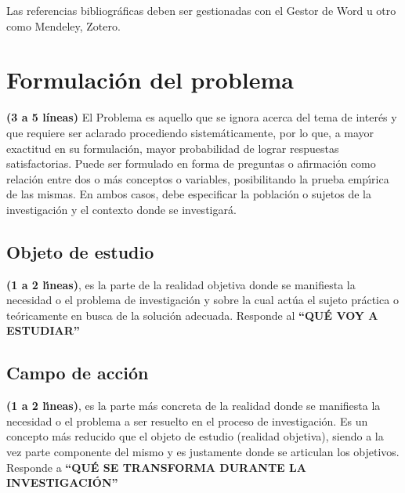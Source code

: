 Las referencias bibliogr\'{a}ficas deben ser gestionadas con el Gestor de Word u otro como Mendeley, 
Zotero. 



\section{Formulaci\'on del problema}
\label{cap0:sec:formulacion_del_problema}

\textbf{(3 a 5 l\'ineas)} El Problema es aquello que se ignora acerca del tema de inter\'{e}s y que 
requiere ser aclarado procediendo sistem\'{a}ticamente, por lo que, a mayor exactitud en su 
formulaci\'{o}n, mayor probabilidad de lograr respuestas satisfactorias. Puede ser formulado en 
forma de preguntas o afirmaci\'{o}n como relaci\'{o}n entre dos o m\'{a}s conceptos o variables, 
posibilitando la prueba emp\'{\i}rica de las mismas. En ambos casos, debe especificar la 
poblaci\'{o}n o sujetos de la investigaci\'{o}n y el contexto donde se investigar\'{a}.


\subsection{Objeto de estudio}
\label{cap0:sub:objecto_de_estudio}

\textbf{(1 a 2 l\'{\i}neas)}, es la parte de la realidad objetiva donde se manifiesta la necesidad 
o el problema de investigaci\'{o}n y sobre la cual act\'{u}a el sujeto pr\'{a}ctica o 
te\'{o}ricamente en busca de la soluci\'{o}n adecuada. Responde al \textbf{``QU\'{E} VOY A ESTUDIAR''}


\subsection{Campo de acci\'on}
\label{cap0:sub:campo_de_accion}

\textbf{(1 a 2 l\'{\i}neas)}, es la parte m\'{a}s concreta de la realidad donde se manifiesta la 
necesidad o el problema a ser resuelto en el proceso de investigaci\'{o}n. Es un concepto m\'{a}s 
reducido que el objeto de estudio (realidad objetiva), siendo a la vez parte componente del mismo 
y es justamente donde se articulan los objetivos. Responde a 
\textbf{``QU\'{E} SE TRANSFORMA DURANTE LA INVESTIGACI\'{O}N''}



